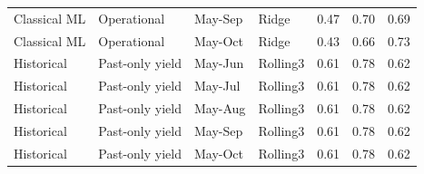\begin{longtable}{@{}p{}p{}p{}p{}rrr@{}}
Classical ML & Operational & May-Sep & Ridge & 0.47 & 0.70 & 0.69 \\
Classical ML & Operational & May-Oct & Ridge & 0.43 & 0.66 & 0.73 \\
Historical & Past-only yield & May-Jun & Rolling3 & 0.61 & 0.78 & 0.62 \\
Historical & Past-only yield & May-Jul & Rolling3 & 0.61 & 0.78 & 0.62 \\
Historical & Past-only yield & May-Aug & Rolling3 & 0.61 & 0.78 & 0.62 \\
Historical & Past-only yield & May-Sep & Rolling3 & 0.61 & 0.78 & 0.62 \\
Historical & Past-only yield & May-Oct & Rolling3 & 0.61 & 0.78 & 0.62 \\
\bottomrule
\end{longtable}
\normalsize
